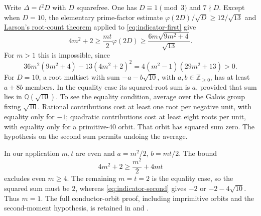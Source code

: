 Write $\Delta=t^2D$ with $D$ squarefree. One has $D\equiv1\pmod3$
and $7\nmid D$. Except when $D=10$, the elementary prime-factor estimate
$\varphi(2D)/\sqrt D\ge12/\sqrt{13}$ and
\href{https://arxiv.org/pdf/1401.1879}{Larson's root-count theorem}
applied to \eqref{eq:indicator-first} give
\[
 4m^2+2\ge\frac{mt}{2}\varphi(2D)
 \ge\frac{6m\sqrt{9m^2+4}}{\sqrt{13}}.
\]
For $m>1$ this is impossible, since
\[
 36m^2(9m^2+4)-13(4m^2+2)^2
 =4(m^2-1)(29m^2+13)>0.
\]
For $D=10$, a root multiset with sum $-a-b\sqrt{10}$, with
$a,b\in\mathbb Z_{\ge0}$, has at least $a+8b$ members. In the equality
case its squared-root sum is $a$, provided that sum lies in
$\mathbb Q(\sqrt{10})$. To see the equality condition, average over
the Galois group fixing $\sqrt{10}$. Rational contributions cost at
least one root per negative unit, with equality only for $-1$;
quadratic contributions cost at least eight roots per unit, with
equality only for a primitive-40 orbit. That orbit has squared sum
zero. The hypothesis on the second sum permits undoing the average.

In our application $m,t$ are even and $a=m^2/2$, $b=mt/2$.
The bound
\[
 4m^2+2\ge\frac{m^2}{2}+4mt
\]
excludes even $m\ge4$. The remaining $m=t=2$ is the equality case,
so the squared sum must be $2$, whereas \eqref{eq:indicator-second}
gives $-2$ or $-2-4\sqrt{10}$. Thus $m=1$.
The full conductor-orbit proof, including imprimitive orbits and the
second-moment hypothesis, is retained in
 and
.

